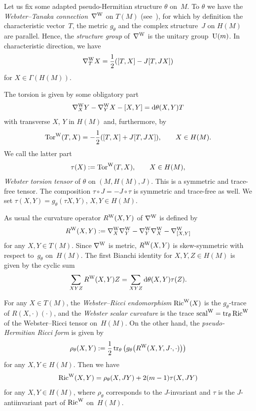 \documentclass[pdftex]{sigma}
\numberwithin{equation}{section}
\begin{document}
Let us fix some adapted pseudo-Hermitian structure $\theta$ on~$M$. To $\theta$ we have the {\em Webster--Tanaka connection}~$\nabla^{\rm W}$ on $T(M)$ (see~\cite{Tan,Web}),
for which by definition the characteristic vector~$T$, the metric $g_\theta$ and the complex structure~$J$ on $H(M)$ are parallel.
Hence, the {\em structure group} of~$\nabla^{\rm W}$ is the unitary group~${\rm U}(m)$.
In characteristic direction, we have
\begin{equation*} \label{WTC} \nabla^{\rm W}_{T}X = \frac{1}{2} ([T,X]-J[T,JX] )\end{equation*}
for $X\in\Gamma(H(M))$.

The torsion is given by some obligatory part
 \[ \nabla^{\rm W}_XY-\nabla^{\rm W}_YX - [X,Y] ={\rm d}\theta(X,Y)T \]
with transverse $X$, $Y$ in $H(M)$ and, furthermore, by
\begin{gather*}%
\operatorname{Tor}^{\rm W}(T,X) = -\frac{1}{2} ([T,X]+J[T,JX] ),\qquad X\in H(M) . \end{gather*}
We call the latter part
\[
\tau(X) := \operatorname{Tor}^{\rm W}(T,X),\qquad X\in H(M),
\]
{\em Webster torsion tensor} of $\theta$ on $(M,H(M),J)$.
This is a symmetric and trace-free tensor. The composition $\tau\circ J=-J\circ \tau$ is symmetric and trace-free as well.
We set $\tau(X,Y)=g_\theta(\tau X,Y)$, $X,Y\in H(M)$.

As usual the curvature operator $R^{\rm W}(X,Y)$ of $\nabla^{\rm W}$ is defined by
\[
R^{\rm W}(X,Y) := \nabla^{\rm W}_X\nabla^{\rm W}_Y- \nabla^{\rm W}_Y\nabla^{\rm W}_X- \nabla^{\rm W}_{[X,Y]}
\]
for any $X,Y\in T(M)$. Since $\nabla^{\rm W}$ is metric,
$R^{\rm W}(X,Y)$ is skew-symmetric with respect to~$g_\theta$ on~$H(M)$.
The first Bianchi identity for $X,Y,Z\in H(M)$ is given by the cyclic sum
\begin{equation}\label{bianchi}
\sum_{XYZ}R^{\rm W}(X,Y)Z = \sum_{XYZ} {\rm d}\theta(X,Y)\tau(Z) .
\end{equation}

For any $X\in T(M)$, the {\em Webster--Ricci endomorphism} $\operatorname{Ric}^{\rm W}(X)$ is the $g_\theta$-trace of $R(X,\cdot)(\cdot)$, and
the {\em Webster scalar curvature} is the trace $\operatorname{scal}^{\rm W}=\operatorname{tr}_\theta \operatorname{Ric}^{\rm W}$ of the Webster--Ricci tensor on~$H(M)$.
On the other hand, the {\em pseudo-Hermitian Ricci form} is given by
\[
\rho_\theta(X,Y) := \frac{1}{2}\operatorname{tr}_\theta\big( g_\theta\big(R^{\rm W}(X,Y,J\cdot,\cdot)\big)\big)
\]
for any $X,Y\in H(M)$.
Then we have
\[
\operatorname{Ric}^{\rm W}(X,Y) = \rho_\theta(X,JY) + 2(m-1)\tau(X,JY)
\]
for any $X,Y\in H(M)$, where $\rho_\theta$ corresponds to the $J$-invariant and $\tau$ is the $J$-antiinvariant part of $\operatorname{Ric}^{\rm W}$ on~$H(M)$.
\end{document}
